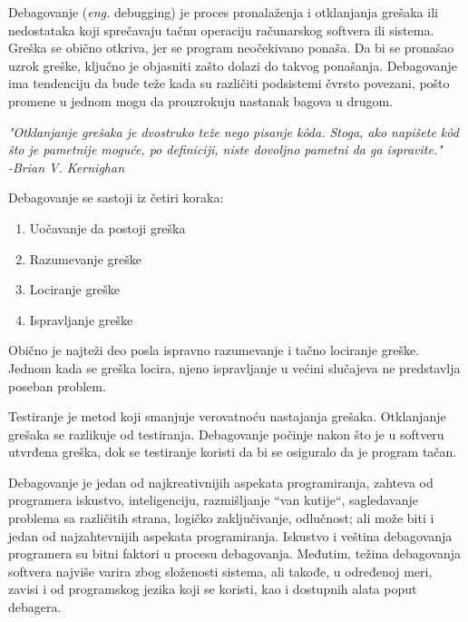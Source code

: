 \documentclass[a4paper]{article}
\begin{document}
Debagovanje (\textit{eng.} debugging) je proces pronalaženja i otklanjanja grešaka ili 
nedostataka koji sprečavaju tačnu operaciju računarskog softvera ili sistema. Greška se 
obično otkriva, jer se program neočekivano ponaša. Da bi se pronašao uzrok greške, 
ključno je objasniti zašto dolazi do takvog ponašanja. Debagovanje ima tendenciju da 
bude teže kada su različiti podsistemi čvrsto povezani, pošto promene u jednom mogu da 
prouzrokuju nastanak bagova u drugom\cite{debagovanje}.	

\vspace{4mm}

\textit{"Otklanjanje grešaka je dvostruko teže nego pisanje k\^{o}da. Stoga, ako napišete k\^{o}d što 
je pametnije moguće, po definiciji, niste dovoljno pametni da ga ispravite."\\
\hspace*{0pt}\hfill-Brian V. Kernighan}

\vspace{4mm}
Debagovanje se sastoji iz četiri koraka\cite{deb_app}:
\begin{enumerate}
\item Uočavanje da postoji greška
\item Razumevanje greške
\item Lociranje greške
\item Ispravljanje greške
\end{enumerate}

\vspace{4mm}

Obično je najteži deo posla ispravno razumevanje i tačno lociranje greške. Jednom kada 
se greška locira, njeno ispravljanje u većini slučajeva ne predstavlja poseban problem.

Testiranje je metod koji smanjuje verovatnoću nastajanja grešaka.
Otklanjanje grešaka se razlikuje od testiranja. Debagovanje počinje
nakon što je u softveru utvrđena greška, dok se testiranje koristi da bi
se osiguralo da je program tačan\cite{deb_app}.

Debagovanje je jedan od najkreativnijih aspekata programiranja, zahteva od programera iskustvo,
inteligenciju, razmišljanje ``van kutije``, sagledavanje problema sa različitih strana, logičko zaključivanje, odlučnost;  
ali može biti i jedan od najzahtevnijih aspekata programiranja.
Iskustvo i veština debagovanja programera su bitni faktori u procesu debagovanja. Međutim, težina 
debagovanja softvera najviše varira zbog složenosti sistema, ali takođe, u određenoj meri,
zavisi i od programskog jezika koji se koristi, kao i dostupnih alata poput debagera\cite{deb_app}.  
\end{document}
